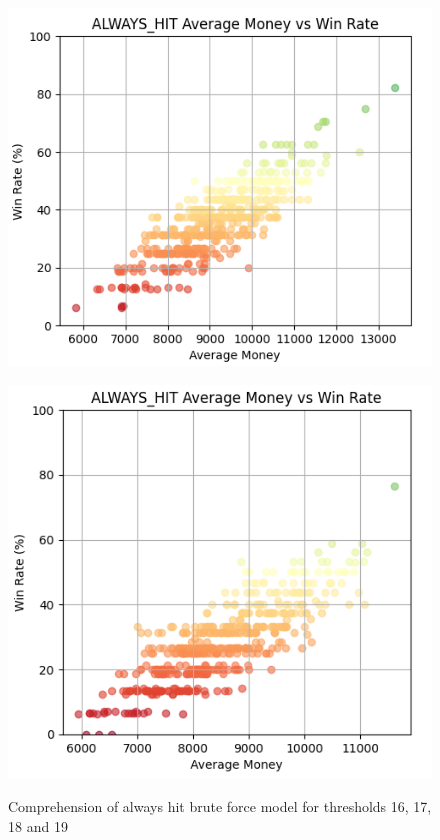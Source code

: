 \documentclass[a4paper,12pt]{report}
\begin{document}
\begin{figure}
    \begin{minipage}{0.45\textwidth}
        \centering
        \includegraphics[scale=0.4]{figures/graphs/18.png}
        \label{fig:18}
    \end{minipage}
    \begin{minipage}{0.45\textwidth}
        \includegraphics[scale=0.4]{figures/graphs/19.png}
        \label{fig:19}
    \end{minipage}
    \label{fig:18_19}
    \caption{Comprehension of always hit brute force model for thresholds 16, 17, 18 and 19}
\end{figure}
\end{document}
